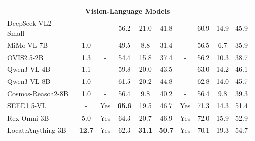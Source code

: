 \begin{table}[t]
{\begin{tabular}{l|c|c|ccc|c|ccc}
\midrule
\multicolumn{10}{c}{{Vision-Language Models}} \\
\midrule
DeepSeek-VL2-Small~\citep{wu2024deepseekvl2mixtureofexpertsvisionlanguagemodels}  & - & - & 56.2 & 21.0 & 41.8 & - & 60.9 & 14.9 & 45.9 \\
MiMo-VL-7B~\citep{coreteam2025mimovltechnicalreport}          & 1.0 & - & 49.5 & 8.8  & 31.4 & - & 56.5 & 6.7  & 35.9 \\
OVIS2.5-2B~\citep{lu2025ovis25technicalreport}          & 1.3 & - & 54.4 & 15.8 & 37.4 & - & 56.2 & 10.3 & 38.7 \\
Qwen3-VL-4B~\citep{bai2025qwen3vltechnicalreport}         & 1.1 & - & 59.8 & 20.0 & 43.5 & - & 63.0 & 14.2 & 46.1 \\ 
Qwen3-VL-8B~\citep{bai2025qwen3vltechnicalreport}         & 1.0 & - & 61.5 & 20.2 & 44.8 & - & 62.8 & 14.0 & 45.7 \\ 
Cosmos-Reason2-8B~\citep{cosmosreason2}         & 1.0 & - & 56.4 & 9.8 & 40.2 & - & 56.4 & 9.8 & 39.3 \\ 
SEED1.5-VL~\citep{guo2025seed15vltechnicalreport}          & - & Yes & \textbf{65.6} & 19.5 & 46.7 & Yes & 71.3 & 14.3 & 51.4 \\
Rex-Omni-3B~\citep{jiang2025rexomni}             & \underline{5.0} & Yes & \underline{64.3} & 20.7 & \underline{46.9} & Yes & \underline{72.0} & 15.9 & 52.9 \\
\rowcolor{lightblue!10}
LocateAnything-3B      & \textbf{12.7} & Yes & 62.3 & \textbf{31.1} & \textbf{50.7} & Yes & 70.1 & 19.3 & 54.7 \\
\bottomrule
\end{tabular}
}
\end{table}